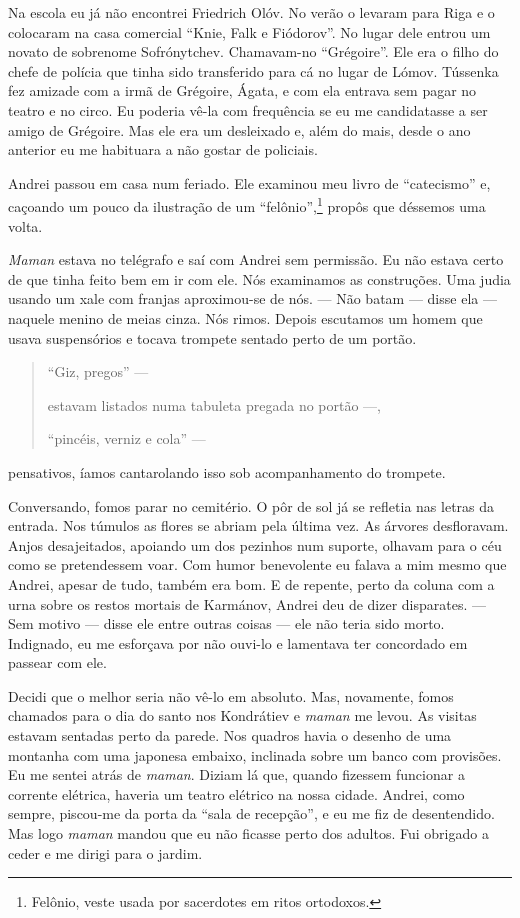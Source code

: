 Na escola eu já não encontrei Friedrich Olóv. No verão o levaram para
Riga e o colocaram na casa comercial ``Knie, Falk e Fiódorov''. No lugar
dele entrou um novato de sobrenome Sofrónytchev. Chamavam-no
``Grégoire''. Ele era o filho do chefe de polícia que tinha sido
transferido para cá no lugar de Lómov. Tússenka fez amizade com a irmã
de Grégoire, Ágata, e com ela entrava sem pagar no teatro e no circo. Eu
poderia vê-la com frequência se eu me candidatasse a ser amigo de
Grégoire. Mas ele era um desleixado e, além do mais, desde o ano
anterior eu me habituara a não gostar de policiais.

Andrei passou em casa num feriado. Ele examinou meu livro de
``catecismo'' e, caçoando um pouco da ilustração de um
``felônio'',\footnote{Felônio, veste usada por sacerdotes em ritos
  ortodoxos.} propôs que déssemos uma volta.

\emph{Maman} estava no telégrafo e saí com Andrei sem permissão. Eu não
estava certo de que tinha feito bem em ir com ele. Nós examinamos as
construções. Uma judia usando um xale com franjas aproximou-se de nós.
--- Não batam --- disse ela --- naquele menino de meias cinza. Nós
rimos. Depois escutamos um homem que usava suspensórios e tocava
trompete sentado perto de um portão.

\begin{quotation}
``Giz, pregos'' ---

estavam listados numa tabuleta pregada no portão ---,

``pincéis, verniz e cola'' ---
\end{quotation}

pensativos, íamos cantarolando isso sob acompanhamento do trompete.

Conversando, fomos parar no cemitério. O pôr de sol já se refletia nas
letras da entrada. Nos túmulos as flores se abriam pela última vez. As
árvores desfloravam. Anjos desajeitados, apoiando um dos pezinhos num
suporte, olhavam para o céu como se pretendessem voar. Com humor
benevolente eu falava a mim mesmo que Andrei, apesar de tudo, também era
bom. E de repente, perto da coluna com a urna sobre os restos mortais de
Karmánov, Andrei deu de dizer disparates. --- Sem motivo --- disse ele
entre outras coisas --- ele não teria sido morto. Indignado, eu me
esforçava por não ouvi-lo e lamentava ter concordado em passear com ele.

Decidi que o melhor seria não vê-lo em absoluto. Mas, novamente, fomos
chamados para o dia do santo nos Kondrátiev e \emph{maman} me levou. As
visitas estavam sentadas perto da parede. Nos quadros havia o desenho de
uma montanha com uma japonesa embaixo, inclinada sobre um banco com
provisões. Eu me sentei atrás de \emph{maman}. Diziam lá que, quando
fizessem funcionar a corrente elétrica, haveria um teatro elétrico na
nossa cidade. Andrei, como sempre, piscou-me da porta da ``sala de
recepção'', e eu me fiz de desentendido. Mas logo \emph{maman} mandou
que eu não ficasse perto dos adultos. Fui obrigado a ceder e me dirigi
para o jardim.

